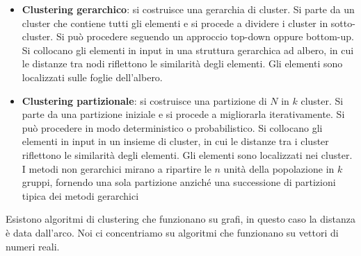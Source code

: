 \begin{itemize}
      \item \textbf{Clustering gerarchico}: si costruisce una gerarchia di cluster.
            Si parte da un cluster che contiene tutti gli elementi e si procede a
            dividere i cluster in sotto-cluster. Si può procedere seguendo un
            approccio top-down oppure bottom-up. Si collocano gli elementi in
            input in una struttura gerarchica ad albero, in cui le distanze tra
            nodi riflettono le similarità degli elementi. Gli elementi sono
            localizzati sulle foglie dell'albero.
      \item \textbf{Clustering partizionale}: si costruisce una partizione di $N$
            in $k$ cluster. Si parte da una partizione iniziale e si procede a
            migliorarla iterativamente. Si può procedere in modo deterministico
            o probabilistico. Si collocano gli elementi in input in un insieme
            di cluster, in cui le distanze tra i cluster riflettono le similarità
            degli elementi. Gli elementi sono localizzati nei cluster. I metodi
            non gerarchici mirano a ripartire le $n$ unità della popolazione in
            $k$ gruppi, fornendo una sola partizione anziché una successione di
            partizioni tipica dei metodi gerarchici
\end{itemize}
Esistono algoritmi di clustering che funzionano su grafi, in questo caso la
distanza è data dall'arco. Noi ci concentriamo su algoritmi che funzionano su
vettori di numeri reali.
